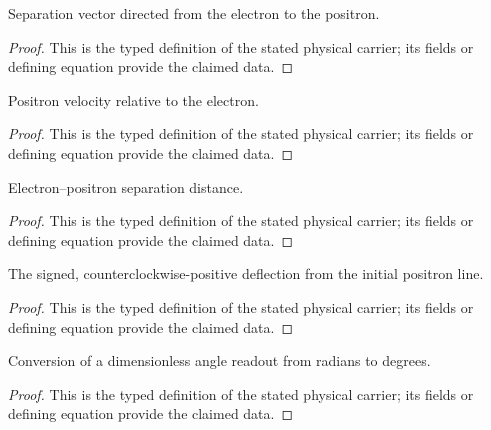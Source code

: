 \begin{definition}
  \label{def:physics:IPhO_2026_1_B_2:aux021}
  Separation vector directed from the electron to the positron.
\end{definition}
\begin{proof}
  This is the typed definition of the stated physical carrier; its fields or defining equation provide the claimed data.
\end{proof}

\begin{definition}
  \label{def:physics:IPhO_2026_1_B_2:aux022}
  Positron velocity relative to the electron.
\end{definition}
\begin{proof}
  This is the typed definition of the stated physical carrier; its fields or defining equation provide the claimed data.
\end{proof}

\begin{definition}
  \label{def:physics:IPhO_2026_1_B_2:aux023}
  Electron--positron separation distance.
\end{definition}
\begin{proof}
  This is the typed definition of the stated physical carrier; its fields or defining equation provide the claimed data.
\end{proof}

\begin{definition}
  \label{def:physics:IPhO_2026_1_B_2:aux024}
  The signed, counterclockwise-positive deflection from the initial positron line.
\end{definition}
\begin{proof}
  This is the typed definition of the stated physical carrier; its fields or defining equation provide the claimed data.
\end{proof}

\begin{definition}
  \label{def:physics:IPhO_2026_1_B_2:aux025}
  Conversion of a dimensionless angle readout from radians to degrees.
\end{definition}
\begin{proof}
  This is the typed definition of the stated physical carrier; its fields or defining equation provide the claimed data.
\end{proof}

